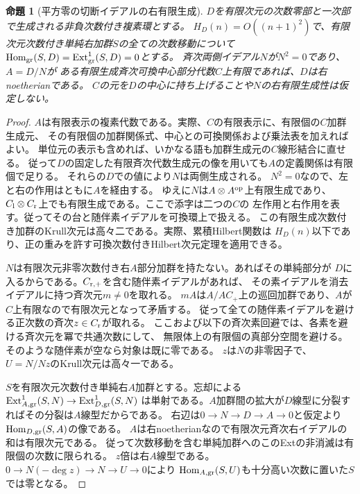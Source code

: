 \documentclass[11pt,a4paper]{ltjsarticle}
\newtheorem{proposition}[theorem]{命題}
\theoremstyle{definition}
\begin{document}
\begin{proposition}[平方零の切断イデアルの右有限生成]
\label{prop:ou-square-zero-depth}
$D$を有限次元の次数零部と一次部で生成される非負次数付き複素環とする。
$H_D(n)=O((n+1)^2)$で、有限次元次数付き単純右加群$S$の全ての次数移動について
$\operatorname{Hom}_{\rm gr}(S,D)=\operatorname{Ext}^1_{\rm gr}(S,D)=0$とする。
斉次両側イデアル$N$が$N^2=0$であり、$A=D/N$が
ある有限生成斉次可換中心部分代数$C$上有限であれば、$D$は右noetherianである。
$C$の元を$D$の中心に持ち上げることや$N$の右有限生成性は仮定しない。
\end{proposition}
\begin{proof}
$A$は有限表示の複素代数である。実際、$C$の有限表示に、有限個の$C$加群生成元、
その有限個の加群関係式、中心との可換関係および乗法表を加えればよい。
単位元の表示も含めれば、いかなる語も加群生成元の$C$線形結合に直せる。
従って$D$の固定した有限斉次代数生成元の像を用いても$A$の定義関係は有限個で足りる。
それらの$D$での値により$N$は両側生成される。
$N^2=0$なので、左と右の作用はともに$A$を経由する。
ゆえに$N$は$A\otimes A^{\rm op}$上有限生成であり、
$C_{\rm l}\otimes C_{\rm r}$上でも有限生成である。ここで添字は二つの$C$の
左作用と右作用を表す。従ってその台と随伴素イデアルを可換環上で扱える。
この有限生成次数付き加群のKrull次元は高々二である。実際、累積Hilbert関数は
$H_D(n)$以下であり、正の重みを許す可換次数付きHilbert次元定理を適用できる。

$N$は有限次元非零次数付き右$A$部分加群を持たない。あればその単純部分が
$D$に入るからである。$C_{{\rm r},+}$を含む随伴素イデアルがあれば、
その素イデアルを消去イデアルに持つ斉次元$m\ne0$を取れる。
$mA$は$A/AC_+$上の巡回加群であり、$A$が$C$上有限なので有限次元となって矛盾する。
従って全ての随伴素イデアルを避ける正次数の斉次$z\in C_{\rm r}$が取れる。
ここおよび以下の斉次素回避では、各素を避ける斉次元を冪で共通次数にして、
無限体上の有限個の真部分空間を避ける。そのような随伴素が空なら対象は既に零である。
$z$は$N$の非零因子で、$U=N/Nz$のKrull次元は高々一である。

$S$を有限次元次数付き単純右$A$加群とする。忘却による
$\operatorname{Ext}^1_{A,{\rm gr}}(S,N)\to\operatorname{Ext}^1_{D,{\rm gr}}(S,N)$
は単射である。$A$加群間の拡大が$D$線型に分裂すればその分裂は$A$線型だからである。
右辺は$0\to N\to D\to A\to0$と仮定より
$\operatorname{Hom}_{D,{\rm gr}}(S,A)$の像である。
$A$は右noetherianなので有限次元斉次右イデアルの和は有限次元である。
従って次数移動を含む単純加群へのこのExtの非消滅は有限個の次数に限られる。
$z$倍は右$A$線型である。$0\to N(-\deg z)\to N\to U\to0$により
$\operatorname{Hom}_{A,{\rm gr}}(S,U)$も十分高い次数に置いた$S$では零となる。


\end{proof}
\end{document}
